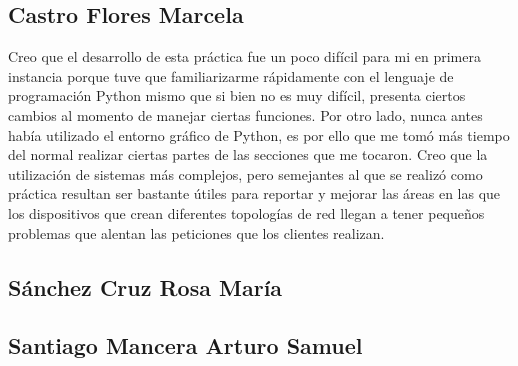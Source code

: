\subsection{Castro Flores Marcela}
Creo que el desarrollo de esta práctica fue un poco difícil para mi en primera instancia porque tuve que familiarizarme rápidamente con el lenguaje de programación Python mismo que si bien no es muy difícil, presenta ciertos cambios al momento de manejar ciertas funciones. Por otro lado, nunca antes había utilizado el entorno gráfico de Python, es por ello que me tomó más tiempo del normal realizar ciertas partes de las secciones que me tocaron. 
Creo que la utilización de sistemas más complejos, pero semejantes al que se realizó como práctica resultan ser bastante útiles para reportar y mejorar las áreas en las que los dispositivos que crean diferentes topologías de red llegan a tener pequeños problemas que alentan las peticiones que los clientes realizan. 
\subsection{Sánchez Cruz Rosa María}
\subsection{Santiago Mancera Arturo Samuel}